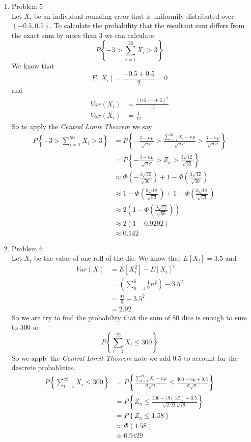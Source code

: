 \documentclass[11pt]{article}
\begin{document}
\begin{enumerate}
\item Problem 5\\
Let $X_i$ be an individual rounding error that is uniformily distributed over $(-0.5,0.5)$. To calculate the probability that the resultant sum differs from the exact sum by more than 3 we can calculate
$$P\left\{-3>\sum_{i=1}^{50}X_i>3\right\}$$
We know that 
$$E[X_i] = \frac{-0.5+0.5}{2} = 0$$
and
\begin{align*}
Var(X_i) &= \frac{(0.5--0.5)^2}{12}\\
Var(X_i) &= \frac{1}{12}
\end{align*}
So to apply the \emph{Central Limit Theorem} we say
\begin{align*}
P\left\{-3>\sum_{i=1}^{50}X_i>3\right\} &= P\left\{-\frac{3-n\mu}{\sqrt{n}\sigma}>\frac{\sum_{i=1}^{50}X_i-n\mu}{\sqrt{n}\sigma}>\frac{3-n\mu}{\sqrt{n}\sigma}\right\}\\
&= P\left\{-\frac{3-n\mu}{\sqrt{n}\sigma} > Z_n > \frac{3\sqrt{12}}{\sqrt{50}}\right\}\\
&\approx \Phi\left(-\frac{3\sqrt{12}}{\sqrt{50}}\right) + 1 - \Phi\left(\frac{3\sqrt{12}}{\sqrt{50}}\right)\\
&\approx 1 - \Phi\left(\frac{3\sqrt{12}}{\sqrt{50}}\right) + 1 - \Phi\left(\frac{3\sqrt{12}}{\sqrt{50}}\right)\\
&\approx 2\left(1 - \Phi\left(\frac{3\sqrt{12}}{\sqrt{50}}\right)\right)\\
&\approx 2\left(1 - 0.9292\right)\\
&\approx 0.142
\end{align*}

\item Problem 6\\
Let $X_i$ be the value of one roll of the die. We know that $E[X_i] = 3.5$ and
\begin{align*}
Var(X) &= E[X_i^2]-E[X_i]^2\\
&= \left(\sum_{n=1}^6\frac{1}{6}n^2\right)-3.5^2\\
&= \frac{91}{6}-3.5^2\\
&= 2.92
\end{align*}
So we are try to find the probability that the sum of 80 dice is enough to sum to 300 or
$$P\left\{\sum_{i=1}^{79}X_i\le300\right\}$$
So we apply the \emph{Central Limit Theorem} note we add $0.5$ to account for the descrete probablities.
\begin{align*}
P\left\{\sum_{i=1}^{79}X_i\le300\right\} &= P\left\{\frac{\sum_{i=1}^{79}X_i - n\mu}{\sigma\sqrt{n}}\le\frac{300-n\mu+0.5}{\sigma\sqrt{n}}\right\}\\
&= P\left\{Z_n\le\frac{300-79(3.5)+0.5}{\sqrt{2.92}\sqrt{79}}\right\}\\
&= P\left\{Z_n\le1.58\right\}\\
&\approx \Phi(1.58)\\
&\approx 0.9429
\end{align*}

\end{enumerate}
\end{document}
